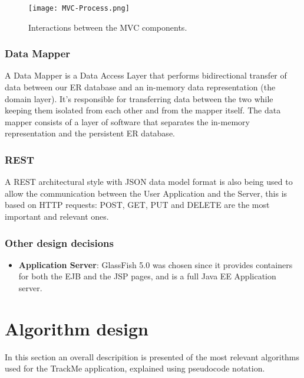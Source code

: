 \documentclass[12pt]{article}
\begin{document}
\begin{figure}[H]
    \centering
    \texttt{[image: MVC-Process.png]}
    \caption{Interactions between the MVC components.}
    \label{fig:MVC-Process}
\end{figure}

\subsubsection{Data Mapper}
A Data Mapper is a Data Access Layer that performs bidirectional transfer of data between our ER 
database and an in-memory data representation (the domain layer). It's responsible 
for transferring data between the two while keeping them isolated from each other and from the mapper
itself. The data mapper consists of a layer of software that separates the in-memory representation and 
the persistent ER database. 

\subsubsection{REST}
A REST architectural style with JSON data model format is also being used to allow the communication 
between the User Application and the Server, this is based on HTTP requests: POST, GET, PUT and 
DELETE are the most important and relevant ones.

\subsubsection{Other design decisions}

\begin{itemize}
    \item \textbf{Application Server}: GlassFish 5.0 was chosen since it provides containers
          for both the EJB and the JSP pages, and is a full Java EE Application server.
\end{itemize}



 
\section{Algorithm design}
In this section an overall descripition is presented of the most relevant algorithms used for the TrackMe 
application, explained using pseudocode notation. 
\end{document}

